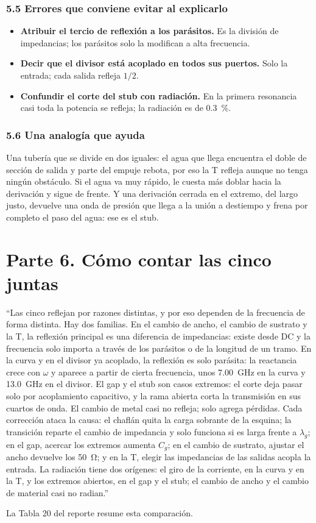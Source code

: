 \documentclass[11pt,letterpaper]{article}
\begin{document}
\section*{5.5 Errores que conviene evitar al explicarlo}
\begin{itemize}
\item \textbf{Atribuir el tercio de reflexión a los parásitos.} Es la división de impedancias; los parásitos solo la modifican a alta frecuencia.
\item \textbf{Decir que el divisor está acoplado en todos sus puertos.} Solo la entrada; cada salida refleja $1/2$.
\item \textbf{Confundir el corte del stub con radiación.} En la primera resonancia casi toda la potencia se refleja; la radiación es de \SI{0.3}{\percent}.
\end{itemize}

\section*{5.6 Una analogía que ayuda}
Una tubería que se divide en dos iguales: el agua que llega encuentra el doble de sección de salida y parte del empuje rebota, por eso la T refleja aunque no tenga ningún obstáculo. Si el agua va muy rápido, le cuesta más doblar hacia la derivación y sigue de frente. Y una derivación cerrada en el extremo, del largo justo, devuelve una onda de presión que llega a la unión a destiempo y frena por completo el paso del agua: ese es el stub.

\newpage
\part*{Parte 6. Cómo contar las cinco juntas}
\begin{idea}
``Las cinco reflejan por razones distintas, y por eso dependen de la frecuencia de forma distinta. Hay dos familias. En el cambio de ancho, el cambio de sustrato y la T, la reflexión principal es una diferencia de impedancias: existe desde DC y la frecuencia solo importa a través de los parásitos o de la longitud de un tramo. En la curva y en el divisor ya acoplado, la reflexión es solo parásita: la reactancia crece con $\omega$ y aparece a partir de cierta frecuencia, unos \SI{7.00}{GHz} en la curva y \SI{13.0}{GHz} en el divisor. El gap y el stub son casos extremos: el corte deja pasar solo por acoplamiento capacitivo, y la rama abierta corta la transmisión en sus cuartos de onda. El cambio de metal casi no refleja; solo agrega pérdidas. Cada corrección ataca la causa: el chaflán quita la carga sobrante de la esquina; la transición reparte el cambio de impedancia y solo funciona si es larga frente a $\lambda_g$; en el gap, acercar los extremos aumenta $C_g$; en el cambio de sustrato, ajustar el ancho devuelve los \SI{50}{\ohm}; y en la T, elegir las impedancias de las salidas acopla la entrada. La radiación tiene dos orígenes: el giro de la corriente, en la curva y en la T, y los extremos abiertos, en el gap y el stub; el cambio de ancho y el cambio de material casi no radian.''
\end{idea}
La Tabla 20 del reporte resume esta comparación.
\end{document}
